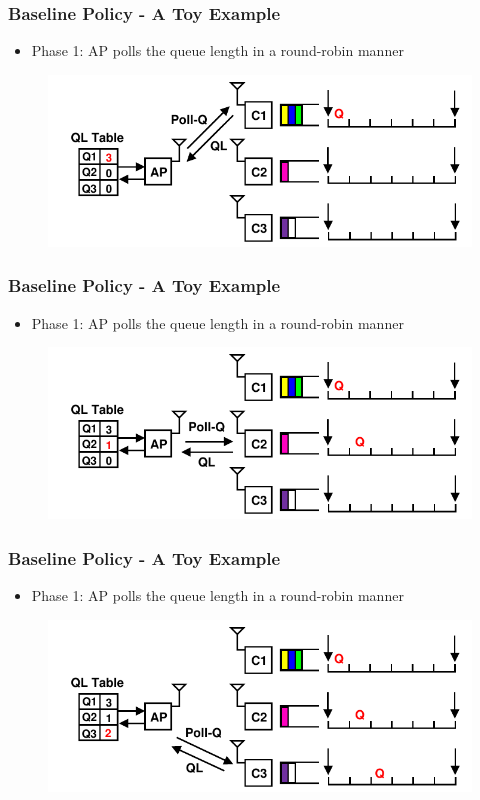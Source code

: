 \documentclass{beamer}
\begin{document}
\begin{frame}
\frametitle{Baseline Policy - A Toy Example}
\begin{itemize}
\item Phase 1: AP polls the queue length in a round-robin manner
\end{itemize}
\begin{figure}
\centering
\includegraphics[scale=0.85]{animation_01.pdf}
\end{figure}
\end{frame}

\begin{frame}
\frametitle{Baseline Policy - A Toy Example}
\begin{itemize}
\item Phase 1: AP polls the queue length in a round-robin manner
\end{itemize}
\begin{figure}
\centering
\includegraphics[scale=0.85]{animation_02.pdf}
\end{figure}
\end{frame}

\begin{frame}
\frametitle{Baseline Policy - A Toy Example}
\begin{itemize}
\item Phase 1: AP polls the queue length in a round-robin manner
\end{itemize}
\begin{figure}
\centering
\includegraphics[scale=0.85]{animation_03.pdf}
\end{figure}
\end{frame}
\end{document}
